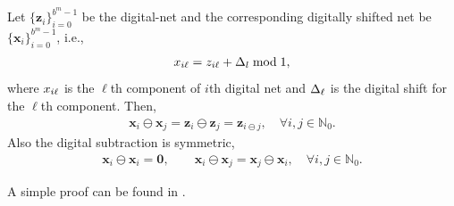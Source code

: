\documentclass{svjour3}                     %
\let\vec\relax
\newcommand{\bm}[1]{\boldsymbol{#1}}
\newcommand{\naturals}{\mathbb{N}}
\newcommand{\vx}{\bm{x}}
\newcommand{\vz}{\bm{z}}
\newcommand{\mG}{\mathsf{G}}
\begin{document}
\begin{lemma}
	\label{lemma:digital_net_prop}
	Let $\{\vz_i\}_{i=0}^{b^{m}-1}$ be the digital-net and the corresponding digitally shifted net be $\{\vx_i\}_{i=0}^{b^{m}-1}$, i.e.,
	\begin{align*}
	\vec{x}_{i \ell} = \vec{z}_{i \ell} + \vec{\Delta}_l \bmod 1,
	\end{align*}
	where $\vec{x}_{i \ell}$ is the $\ell$th component of $i$th digital net and $\vec{\Delta}_{\ell}$ is the digital shift for the $\ell$th component. 
	Then,
	\begin{align}
	\label{eqn:digital_shift_prop}
	\vx_i \ominus \vx_j = \vz_i \ominus \vz_j = \vz_{i \ominus j}, \quad \forall i,j \in \naturals_0. 
	\end{align}
	Also the digital subtraction is symmetric,
	\begin{align}
	\label{eqn:digital_net_symmetric_prop}
	\vx_i \ominus \vx_i = \boldsymbol{ 0}, \qquad 
	\vx_i \ominus \vx_j = \vx_j \ominus \vx_i, \quad \forall i,j \in \naturals_0.
	\end{align}
\end{lemma}
A simple proof can be found in \cite{JagThesis19a}.

\end{document}
